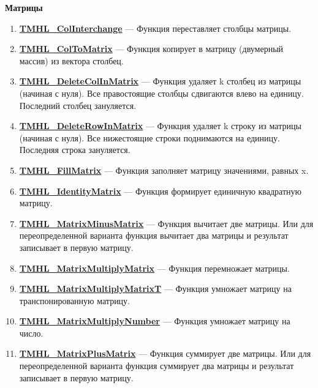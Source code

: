 \documentclass[a4paper,12pt]{article}
\begin{document}
\textbf{Матрицы}
\begin{enumerate}

\item \textbf{\hyperref[TMHL_ColInterchange]{TMHL\_ColInterchange}} --- Функция переставляет столбцы матрицы.

\item \textbf{\hyperref[TMHL_ColToMatrix]{TMHL\_ColToMatrix}} --- Функция копирует в матрицу (двумерный массив) из вектора столбец.

\item \textbf{\hyperref[TMHL_DeleteColInMatrix]{TMHL\_DeleteColInMatrix}} --- Функция удаляет k столбец из матрицы (начиная с нуля). Все правостоящие столбцы сдвигаются влево  на единицу. Последний столбец зануляется.

\item \textbf{\hyperref[TMHL_DeleteRowInMatrix]{TMHL\_DeleteRowInMatrix}} --- Функция удаляет k строку из матрицы (начиная с нуля). Все нижестоящие строки поднимаются на единицу. Последняя строка зануляется.

\item \textbf{\hyperref[TMHL_FillMatrix]{TMHL\_FillMatrix}} --- Функция заполняет матрицу значениями, равных x.

\item \textbf{\hyperref[TMHL_IdentityMatrix]{TMHL\_IdentityMatrix}} --- Функция формирует единичную квадратную матрицу.

\item \textbf{\hyperref[TMHL_MatrixMinusMatrix]{TMHL\_MatrixMinusMatrix}} --- Функция вычитает две матрицы. Или для переопределенной варианта функция вычитает два матрицы и результат записывает в первую матрицу. 

\item \textbf{\hyperref[TMHL_MatrixMultiplyMatrix]{TMHL\_MatrixMultiplyMatrix}} --- Функция перемножает матрицы.

\item \textbf{\hyperref[TMHL_MatrixMultiplyMatrixT]{TMHL\_MatrixMultiplyMatrixT}} --- Функция умножает матрицу на транспонированную матрицу.

\item \textbf{\hyperref[TMHL_MatrixMultiplyNumber]{TMHL\_MatrixMultiplyNumber}} --- Функция умножает матрицу на число.

\item \textbf{\hyperref[TMHL_MatrixPlusMatrix]{TMHL\_MatrixPlusMatrix}} --- Функция суммирует две матрицы. Или для переопределенной варианта функция суммирует два матрицы и результат записывает в первую матрицу. 


\end{enumerate}
\end{document}
